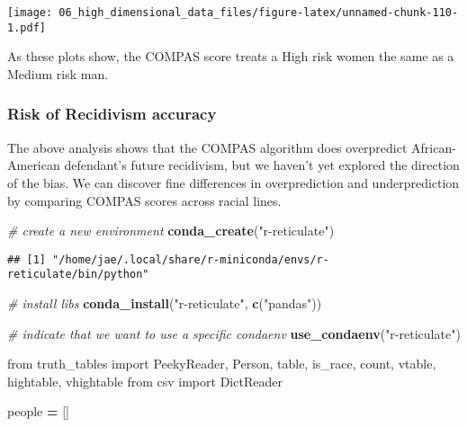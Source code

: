 \documentclass[
]{book}
\newenvironment{Shaded}{\begin{snugshade}}{\end{snugshade}}
\newcommand{\CommentTok}[1]{\textcolor[rgb]{0.56,0.35,0.01}{\textit{#1}}}
\newcommand{\ImportTok}[1]{#1}
\newcommand{\KeywordTok}[1]{\textcolor[rgb]{0.13,0.29,0.53}{\textbf{#1}}}
\newcommand{\NormalTok}[1]{#1}
\newcommand{\OperatorTok}[1]{\textcolor[rgb]{0.81,0.36,0.00}{\textbf{#1}}}
\newcommand{\StringTok}[1]{\textcolor[rgb]{0.31,0.60,0.02}{#1}}
\begin{document}
\texttt{[image: 06\_high\_dimensional\_data\_files/figure-latex/unnamed-chunk-110-1.pdf]}

As these plots show, the COMPAS score treats a High risk women the same as a Medium risk man.

\hypertarget{risk-of-recidivism-accuracy}{%
\subsubsection{Risk of Recidivism accuracy}\label{risk-of-recidivism-accuracy}}

The above analysis shows that the COMPAS algorithm does overpredict African-American defendant's future recidivism, but we haven't yet explored the direction of the bias. We can discover fine differences in overprediction and underprediction by comparing COMPAS scores across racial lines.

\begin{Shaded}
\begin{Highlighting}[]
\CommentTok{\# create a new environment }
\KeywordTok{conda\_create}\NormalTok{(}\StringTok{"r{-}reticulate"}\NormalTok{)}
\end{Highlighting}
\end{Shaded}

\begin{verbatim}
## [1] "/home/jae/.local/share/r-miniconda/envs/r-reticulate/bin/python"
\end{verbatim}

\begin{Shaded}
\begin{Highlighting}[]
\CommentTok{\# install libs }
\KeywordTok{conda\_install}\NormalTok{(}\StringTok{"r{-}reticulate"}\NormalTok{, }\KeywordTok{c}\NormalTok{(}\StringTok{"pandas"}\NormalTok{))}

\CommentTok{\# indicate that we want to use a specific condaenv}
\KeywordTok{use\_condaenv}\NormalTok{(}\StringTok{"r{-}reticulate"}\NormalTok{)}
\end{Highlighting}
\end{Shaded}

\begin{Shaded}
\begin{Highlighting}[]

\ImportTok{from}\NormalTok{ truth\_tables }\ImportTok{import}\NormalTok{ PeekyReader, Person, table, is\_race, count, vtable, hightable, vhightable}
\ImportTok{from}\NormalTok{ csv }\ImportTok{import}\NormalTok{ DictReader}

\NormalTok{people }\OperatorTok{=}\NormalTok{ []}
\end{Highlighting}
\end{Shaded}
\end{document}
